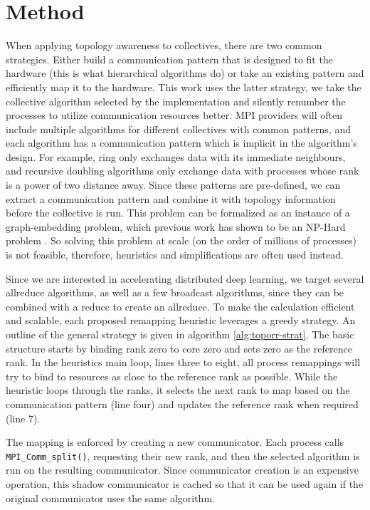 \section{Method}
When applying topology awareness to collectives, there are two common strategies.
Either build a communication pattern that is designed to fit the hardware (this is what hierarchical algorithms do) or take an existing pattern and efficiently map it to the hardware.
This work uses the latter strategy, we take the collective algorithm selected by the implementation and silently renumber the processes to utilize communication resources better.
MPI providers will often include multiple algorithms for different collectives with common patterns, and each algorithm has a communication pattern which is implicit in the algorithm's design.
For example, ring only exchanges data with its immediate neighbours, and recursive doubling algorithms only exchange data with processes whose rank is a power of two distance away.
Since these patterns are pre-defined, we can extract a communication pattern and combine it with topology information before the collective is run.
This problem can be formalized as an instance of a graph-embedding problem, which previous work has shown to be an NP-Hard problem \cite{Hoefler2011GenericTopoMappingStrats}. 
So solving this problem at scale (on the order of millions of processes) is not feasible, therefore, heuristics and simplifications are often used instead.

Since we are interested in accelerating distributed deep learning, we target several allreduce algorithms, as well as a few broadcast algorithms, since they can be combined with a reduce to create an allreduce.
To make the calculation efficient and scalable, each proposed remapping heuristic leverages a greedy strategy.
An outline of the general strategy is given in algorithm \ref{alg:toporr-strat}.
The basic structure starts by binding rank zero to core zero and sets zero as the reference rank.
In the heuristics main loop, lines three to eight, all process remappings will try to bind to resources as close to the reference rank as possible.
While the heuristic loops through the ranks, it selects the next rank to map based on the communication pattern (line four) and updates the reference rank when required (line 7).

The mapping is enforced by creating a new communicator.
Each process calls \texttt{MPI\_Comm\_split()}, requesting their new rank, and then the selected algorithm is run on the resulting communicator.
Since communicator creation is an expensive operation, this shadow communicator is cached so that it can be used again if the original communicator uses the same algorithm.

